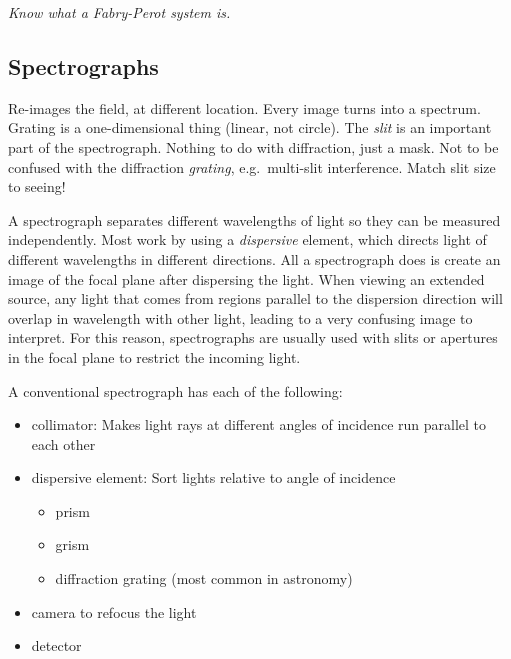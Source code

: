 \documentclass[12pt]{article}
\newcommand{\mynotes}[1]{\textcolor{myBlue}{#1}}
\newcommand{\test}[1]{%
    \begin{center}
        {\parbox{0.9\textwidth}{\textit{\small#1}}}
    \end{center}}
\begin{document}
\test{Know what a Fabry-Perot system is.}

\subsection{Spectrographs}
\mynotes{Re-images the field, at different location. Every image turns into a
spectrum. Grating is a one-dimensional thing (linear, not circle). The
\textit{slit} is an important part of the spectrograph. Nothing to do with
diffraction, just a mask. Not to be confused with the diffraction
\emph{grating}, e.g.\ multi-slit interference. Match slit size to seeing!}

A spectrograph separates different wavelengths of light so they can be measured
independently. Most work by using a \textit{dispersive} element, which directs
light of different wavelengths in different directions. All a spectrograph does
is create an image of the focal plane after dispersing the light. When viewing
an extended source, any light that comes from regions parallel to the
dispersion direction will overlap in wavelength with other light, leading to a
very confusing image to interpret. For this reason, spectrographs are usually
used with slits or apertures in the focal plane to restrict the incoming light.

A conventional spectrograph has each of the following:
\begin{itemize}
    \item collimator: Makes light rays at different angles of incidence run
        parallel to each other
    \item dispersive element: Sort lights relative to angle of incidence
        \begin{itemize}
            \item prism
            \item grism
            \item diffraction grating (most common in astronomy)
        \end{itemize}
    \item camera to refocus the light
    \item detector
\end{itemize}
\end{document}
